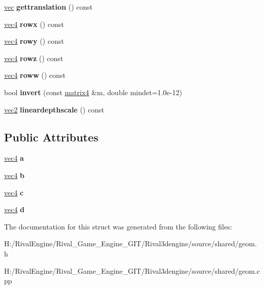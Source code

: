 \begin{DoxyCompactItemize}
\hyperlink{structvec}{vec} {\bfseries gettranslation} () const
\item 
\mbox{\label{structmatrix4_a6505672ab5d56a923cbdc3b6cea3f167}} 
\hyperlink{structvec4}{vec4} {\bfseries rowx} () const
\item 
\mbox{\label{structmatrix4_a3642552b75c9d0c152127d30922933d7}} 
\hyperlink{structvec4}{vec4} {\bfseries rowy} () const
\item 
\mbox{\label{structmatrix4_aed389738cf122672da3b00628ecf4e2f}} 
\hyperlink{structvec4}{vec4} {\bfseries rowz} () const
\item 
\mbox{\label{structmatrix4_a2602e2d92f8bacc8d103a7f83738e230}} 
\hyperlink{structvec4}{vec4} {\bfseries roww} () const
\item 
\mbox{\label{structmatrix4_a8c2b2259f2ba5c6866a9b26291446dab}} 
bool {\bfseries invert} (const \hyperlink{structmatrix4}{matrix4} \&m, double mindet=1.\+0e-\/12)
\item 
\mbox{\label{structmatrix4_afa48da8f2888731c4efbc1f9f9dc586d}} 
\hyperlink{structvec2}{vec2} {\bfseries lineardepthscale} () const
\end{DoxyCompactItemize}
\subsection*{Public Attributes}
\begin{DoxyCompactItemize}
\item 
\mbox{\label{structmatrix4_a3bae8b63556427e0ead792253eb75fb2}} 
\hyperlink{structvec4}{vec4} {\bfseries a}
\item 
\mbox{\label{structmatrix4_a3924742529729659bb515f3858886ca9}} 
\hyperlink{structvec4}{vec4} {\bfseries b}
\item 
\mbox{\label{structmatrix4_a0caa067d08364a4f27696c9b8a71f86c}} 
\hyperlink{structvec4}{vec4} {\bfseries c}
\item 
\mbox{\label{structmatrix4_af80f95786cc362f9aef963ecb3a7ab96}} 
\hyperlink{structvec4}{vec4} {\bfseries d}
\end{DoxyCompactItemize}


The documentation for this struct was generated from the following files\+:\begin{DoxyCompactItemize}
\item 
H\+:/\+Rival\+Engine/\+Rival\+\_\+\+Game\+\_\+\+Engine\+\_\+\+G\+I\+T/\+Rival3dengine/source/shared/geom.\+h\item 
H\+:/\+Rival\+Engine/\+Rival\+\_\+\+Game\+\_\+\+Engine\+\_\+\+G\+I\+T/\+Rival3dengine/source/shared/geom.\+cpp\end{DoxyCompactItemize}
